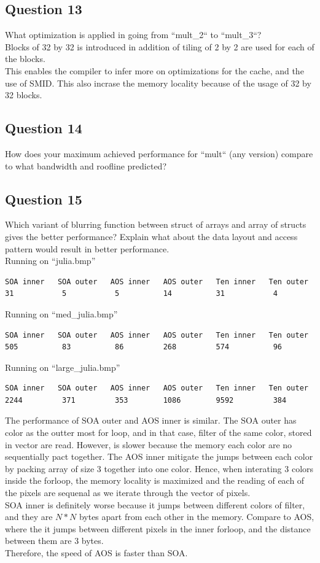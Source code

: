 \documentclass[]{article}
\begin{document}
\subsection*{Question 13}
    What optimization is applied in going from ``mult\_2`` to ``mult\_3``?
    \\[1.1em]
    Blocks of 32 by 32 is introduced in addition of tiling of 2 by 2 are used for each of the blocks. 
    \\[1.1em]
    This enables the compiler to infer more on optimizations for the cache, and the use of SMID. This also incrase the memory locality because of the usage of 32 by 32 blocks.

\subsection*{Question 14}
    How does your maximum achieved performance for ``mult`` (any version) compare to what bandwidth and roofline predicted?

\subsection*{Question 15}
    Which variant of blurring function between struct of arrays and array of structs gives the better performance? Explain what about the data layout and access pattern would result in better performance.
    \\
    Running on ``julia.bmp''
    \begin{lstlisting}
SOA inner   SOA outer   AOS inner   AOS outer   Ten inner   Ten outer
31           5           5          14          31           4
    \end{lstlisting}
    Running on ``med\_julia.bmp''
    \begin{lstlisting}
SOA inner   SOA outer   AOS inner   AOS outer   Ten inner   Ten outer
505          83          86         268         574          96
    \end{lstlisting}
    Running on ``large\_julia.bmp''
    \begin{lstlisting}
SOA inner   SOA outer   AOS inner   AOS outer   Ten inner   Ten outer
2244         371         353        1086        9592         384
    \end{lstlisting}
    The performance of SOA outer and AOS inner is similar. The SOA outer has color as the outter most for loop, and in that case, filter of the same color, stored in vector are read. However, is slower because the memory each color are no sequentially pact together. The AOS inner mitigate the jumps between each color by packing array of size 3 together into one color. Hence, when interating 3 colors inside the forloop, the memory locality is maximized and the reading of each of the pixels are sequenal as we iterate through the vector of pixels. 
    \\[1.1em]
    SOA inner is definitely worse because it jumps between different colors of filter, and they are $N*N$ bytes apart from each other in the memory. Compare to AOS, where the it jumps between different pixels in the inner forloop, and the distance between them are 3 bytes. 
    \\[1.1em]
    Therefore, the speed of AOS is faster than SOA. 
\end{document}
